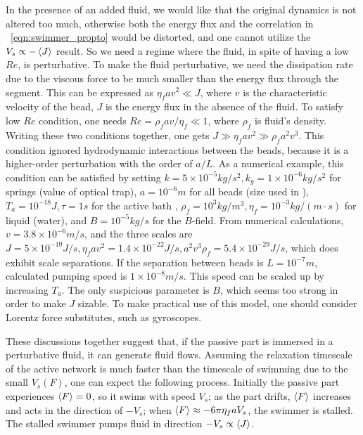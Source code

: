 \documentclass[
 preprint,
 preprintnumbers,
 amsmath,amssymb,
 aps,
 pre,
 longbibliography,
 superscriptaddress,
 10pt, twocolumn
]{revtex4-1}
\begin{document}
In the presence of an added fluid, we would like that the original dynamics is not altered too much, otherwise both the energy flux and the correlation in \eqnname~\eqref{eqn:swimmer_propto} would be distorted, and one cannot utilize the $V_s \propto -\expval{J}$ result.
So we need a regime where the fluid, in spite of having a low $Re$, is perturbative.
To make the fluid perturbative, we need the dissipation rate due to the viscous force to be much smaller than the energy flux through the segment. This can be expressed as $\eta_f a v^2 \ll J$, where $v$ is the characteristic velocity of the bead, $J$ is the energy flux in the absence of the fluid.
To satisfy low $Re$ condition, one needs $Re = \rho_f a v /\eta_f \ll 1$, where $\rho_f$ is fluid's density.
Writing these two conditions together, one gets $J \gg \eta_f a v^2 \gg \rho_f a^2 v^3$.
This condition ignored hydrodynamic interactions between the beads, because it is a higher-order perturbation with the order of $a/L$.
As a numerical example, this condition can be satisfied by setting $k=5\times 10^{-5} kg/s^2, k_g=1\times 10^{-6} kg/s^2$ for springs (value of optical trap), $a=10^{-6}m$ for all beads (size used in \cite{Leoni2009BasicSwimmer}), $T_a=10^{-18} J, \tau=1s$ for the active bath \cite{Wu2000ParticleDiffusion}, $\rho_f=10^3kg/m^3, \eta_f=10^{-3}kg/(m\cdot s)$ for liquid (water), and $B=10^{-5} kg/s$ for the $B$-field.
From numerical calculations, $v=3.8\times 10^{-6}m/s$, and the three scales are $J=5\times 10^{-19}J/s, \eta_f av^2=1.4\times 10^{-22}J/s, a^2v^3\rho_f=5.4\times 10^{-29}J/s$, which does exhibit scale separations.
If the separation between beads is $L=10^{-7}m$, calculated pumping speed is $1\times 10^{-8} m/s$.
This speed can be scaled up by increasing $T_a$.
The only suspicious parameter is $B$, which seems too strong in order to make $J$ sizable. To make practical use of this model, one should consider Lorentz force substitutes, such as gyroscopes.

These discussions together suggest that, if the passive part is immersed in a perturbative fluid, it can generate fluid flows.
Assuming the relaxation timescale of the active network is much faster than the timescale of swimming due to the small $V_s(F)$, one can expect the following process. Initially the passive part experiences $\expval{F}=0$, so it swims with speed $V_s$; as the part drifts, $\expval{F}$ increases and acts in the direction of $-V_s$; when $\expval{F} \approx -6\pi\eta_f a V_s$, the swimmer is stalled. The stalled swimmer pumps fluid in direction $-V_s \propto \expval{J}$.
\end{document}

